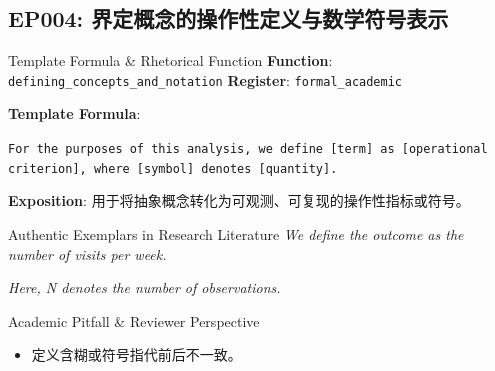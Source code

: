 \subsection{EP004: 界定概念的操作性定义与数学符号表示}\label{sec:ep:EP004}
\begin{ConceptBox}{Template Formula \& Rhetorical Function}
\textbf{Function}: \texttt{defining\_concepts\_and\_notation} \quad \textbf{Register}: \texttt{formal\_academic}\par\vspace{3pt}
\textbf{Template Formula}:\par\noindent\texttt{For the purposes of this analysis, we define [term] as [operational criterion], where [symbol] denotes [quantity].}\par\vspace{4pt}
\textbf{Exposition}: 用于将抽象概念转化为可观测、可复现的操作性指标或符号。
\end{ConceptBox}
\begin{ExampleBox}{Authentic Exemplars in Research Literature}
\textit{We define the outcome as the number of visits per week.}\par\vspace{2pt}
\textit{Here, N denotes the number of observations.}\par\vspace{2pt}
\end{ExampleBox}
\begin{TipBox}{Academic Pitfall \& Reviewer Perspective}
\begin{itemize}[leftmargin=1.5em, itemsep=1pt]
  \item 定义含糊或符号指代前后不一致。
\end{itemize}
\end{TipBox}
\vspace{6pt}
